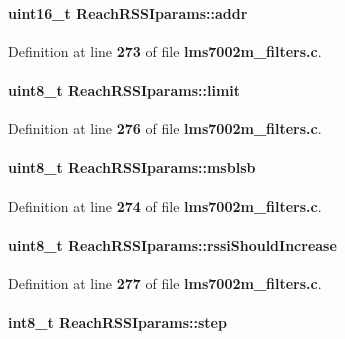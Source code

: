 \paragraph[{addr}]{\setlength{\rightskip}{0pt plus 5cm}uint16\+\_\+t Reach\+R\+S\+S\+Iparams\+::addr}\label{structReachRSSIparams_a9c0b65221e90192da856736cb572a032}


Definition at line {\bf 273} of file {\bf lms7002m\+\_\+filters.\+c}.

\paragraph[{limit}]{\setlength{\rightskip}{0pt plus 5cm}uint8\+\_\+t Reach\+R\+S\+S\+Iparams\+::limit}\label{structReachRSSIparams_acc0223b03681aee1a4a4b035366ae9a0}


Definition at line {\bf 276} of file {\bf lms7002m\+\_\+filters.\+c}.

\paragraph[{msblsb}]{\setlength{\rightskip}{0pt plus 5cm}uint8\+\_\+t Reach\+R\+S\+S\+Iparams\+::msblsb}\label{structReachRSSIparams_a829f3c4afb7f4c7d5666ccc31abe6b9a}


Definition at line {\bf 274} of file {\bf lms7002m\+\_\+filters.\+c}.

\paragraph[{rssi\+Should\+Increase}]{\setlength{\rightskip}{0pt plus 5cm}uint8\+\_\+t Reach\+R\+S\+S\+Iparams\+::rssi\+Should\+Increase}\label{structReachRSSIparams_a009c826fef7dcae46439a78d0bc06ef0}


Definition at line {\bf 277} of file {\bf lms7002m\+\_\+filters.\+c}.

\paragraph[{step}]{\setlength{\rightskip}{0pt plus 5cm}int8\+\_\+t Reach\+R\+S\+S\+Iparams\+::step}\label{structReachRSSIparams_ac159c036a367fac7ffd8af759cfc0289}


